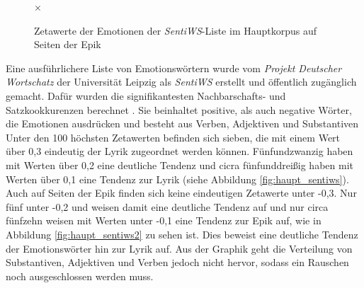 \documentclass[a4paper,10p]{article}
\begin{document}
\begin{figure}{}
\begin{minipage}[b]{.45\linewidth}
        \caption{Zetawerte der Emotionen der \textit{SentiWS}-Liste im Hauptkorpus auf Seiten der Epik}  
        \label{haupt_sentiws2}×
    \end{minipage}
\end{figure}

Eine ausführlichere Liste von Emotionswörtern wurde vom \textit{Projekt Deutscher Wortschatz} der Universität Leipzig als \textit{SentiWS} erstellt und öffentlich zugänglich gemacht. Dafür wurden die signifikantesten Nachbarschafts- und Satzkookkurenzen berechnet \citep{Sentiws}. Sie beinhaltet positive, als auch negative Wörter, die Emotionen ausdrücken und besteht aus Verben, Adjektiven und Substantiven \citep[vgl.]{Remus} Unter den 100 höchsten Zetawerten befinden sich sieben, die mit einem Wert über 0,3 eindeutig der Lyrik zugeordnet werden können. Fünfundzwanzig haben mit Werten über 0,2 eine deutliche Tendenz und cicra fünfunddreißig haben mit Werten über 0,1 eine Tendenz zur Lyrik (siehe Abbildung \ref{fig:haupt_sentiws}). Auch auf Seiten der Epik finden sich keine eindeutigen Zetawerte unter -0,3. Nur fünf unter -0,2 und weisen damit eine deutliche Tendenz auf und nur circa fünfzehn weisen mit Werten unter -0,1 eine Tendenz zur Epik auf, wie in Abbildung \ref{fig:haupt_sentiws2} zu sehen ist. Dies beweist eine deutliche Tendenz der Emotionswörter hin zur Lyrik auf. Aus der Graphik geht die Verteilung von Substantiven, Adjektiven und Verben jedoch nicht hervor, sodass ein Rauschen noch ausgeschlossen werden muss. \par 
\end{document}
